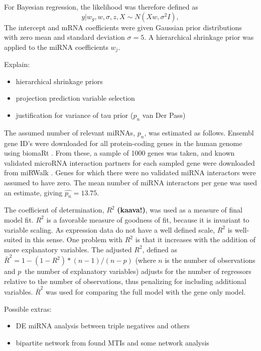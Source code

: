 For Bayesian regression, the likelihood was therefore defined as
\begin{equation}
	y | w_g, w, \sigma, z, X \sim N(Xw, \sigma^2I),
\end{equation}
The intercept and mRNA coefficients were given Gaussian prior
distributions with zero mean and standard deviation $\sigma=5$.
A hierarchical shrinkage prior was applied to the miRNA coefficients
$w_j$.

Explain:
\begin{itemize}
  \item hierarchical shrinkage priors
  \item projection prediction variable selection
  \item justification for variance of tau prior ($p_n$ van Der Pass)
\end{itemize}

The assumed number of relevant miRNAs, $p_n$, was estimated as follows.
Ensembl gene ID's were downloaded for all protein-coding genes in the human
genome using biomaRt \citep{biomaRt}. From these, a sample of 1000 genes was
taken, and known validated microRNA interaction partners for each sampled gene
were downloaded from miRWalk \citep{Dweep2015}. Genes for which there were no
validated miRNA interactors were assumed to have zero. The mean number of
miRNA interactors per gene was used an estimate, giving
$\hat{p_n} = 13.75$.

The coefficient of determination, $R^2$ \textbf{(kaava!)}, was used as a measure of final model
fit. $R^2$ is a favorable measure of goodness of fit, because it is invariant
to variable scaling. As expression data do not have a well defined scale,
$R^2$ is well-suited in this sense. One problem with $R^2$ is that it
increases with the addition of more explanatory variables. The adjusted $R^2$,
defined as $\bar{R}^2 = 1-(1-R^2)*(n-1)/(n-p)$ (where $n$ is the number of
observations and $p$ the number of explanatory variables) adjusts for the
number of regressors relative to the number of observations, thus penalizing
for including additional variables. $\bar{R}^2$ was used for comparing the
full model with the gene only model.

Possible extras:
\begin{itemize}
	\item DE miRNA analysis between triple negatives and others
	\item bipartite network from found MTIs and some network analysis
\end{itemize}
